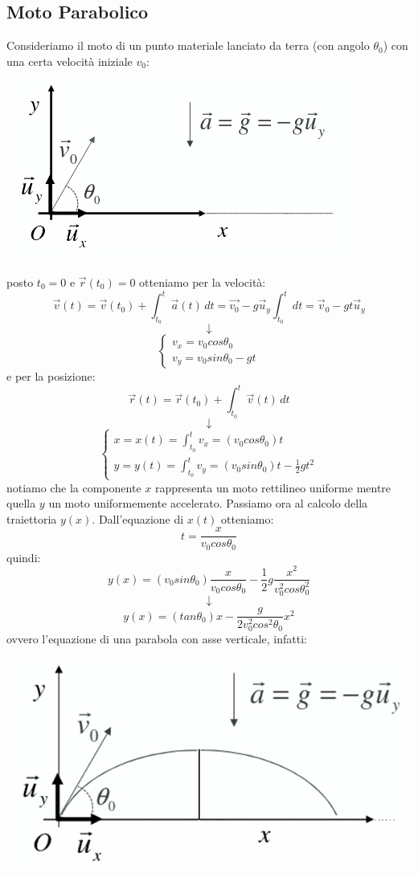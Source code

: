 \documentclass[a4paper,12pt, oneside]{book}
\begin{document}
\subsection{Moto Parabolico}
Consideriamo il moto di un punto materiale lanciato da terra (con angolo $\theta_0$) con una certa velocità iniziale $v_0$:
\begin{center}
\includegraphics[scale=0.5]{img/par.png}
\end{center}
posto $t_0=0$ e $\vec{r}(t_0)=0$
otteniamo per la velocità:
$$\vec{v}(t)=\vec{v}(t_0)+\int_{t_0}^t\vec{a}(t)\,dt=\vec{v_0}-g\vec{u}_y\int_{t_0}^t dt=\vec{v}_0-gt\vec{u}_y$$
$$\downarrow$$
$$
\begin{cases}
v_x=v_0cos\theta_0\\
v_y=v_0sin\theta_0-gt
\end{cases}
$$
\newpage
e per la posizione:
$$\vec{r}(t)=\vec{r}(t_0)+\int_{t_0}^t\vec{v}(t)\,dt$$
$$\downarrow$$
$$
\begin{cases}
x=x(t)=\int_{t_0}^t v_x=(v_0cos\theta_0)t\\
y=y(t)=\int_{t_0}^t v_y=(v_0sin\theta_0)t-\frac{1}{2}gt^2
\end{cases}
$$
notiamo che la componente $x$ rappresenta un moto rettilineo uniforme mentre quella $y$ un moto uniformemente accelerato. Passiamo ora al calcolo della traiettoria $y(x)$. Dall'equazione di $x(t)$ otteniamo:
$$t=\frac{x}{v_0cos\theta_0}$$
quindi:
$$y(x)=(v_0sin\theta_0)\frac{x}{v_0cos\theta_0}-\frac{1}{2}g\frac{x^2}{v_0^2cos\theta^2_0}$$
$$\downarrow$$
$$y(x)=(tan\theta_0)x-\frac{g}{2v_0^2cos^2\theta_0}x^2$$
ovvero l'equazione di una parabola con asse verticale, infatti:
\begin{center}
\includegraphics[scale=0.5]{img/par2.png}
\end{center}
\end{document}
